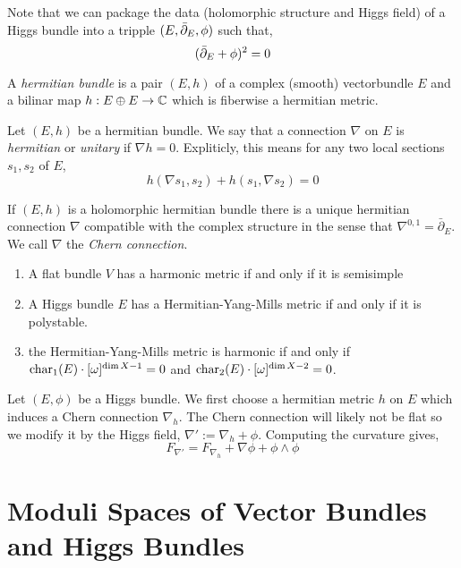 \documentclass[12pt]{article}
\begin{document}
Note that we can package the data (holomorphic structure and Higgs field) of a Higgs bundle into a tripple $(E, \bar{\partial}_E, \phi)$ such that,
\[ (\bar{\partial}_E + \phi)^2 = 0 \]

\begin{defn}
A \textit{hermitian bundle} is a pair $(E, h)$ of a complex (smooth) vectorbundle $E$ and a bilinar map $h : E \oplus E \to \mathbb{C}$ which is fiberwise a hermitian metric.
\end{defn}

\begin{defn}
Let $(E, h)$ be a hermitian bundle. We say that a connection $\nabla$ on $E$ is \textit{hermitian} or \textit{unitary} if $\nabla h = 0$. Expliticly, this means for any two local sections $s_1, s_2$ of $E$,
\[ h(\nabla s_1, s_2) + h(s_1, \nabla s_2) = 0 \] 
\end{defn}

\begin{theorem}
If $(E, h)$ is a holomorphic hermitian bundle there is a unique hermitian connection $\nabla$ compatible with the complex structure in the sense that $\nabla^{0,1} = \bar{\partial}_E$. We call $\nabla$ the \textit{Chern connection}.
\end{theorem}



\begin{theorem}
\begin{enumerate}
\item A flat bundle $V$ has a harmonic metric if and only if it is semisimple
\item A Higgs bundle $E$ has a Hermitian-Yang-Mills metric if and only if it is polystable. 
\item the Hermitian-Yang-Mills metric is harmonic if and only if $\operatorname{\mathrm{char}}_1(E) \cdot [\omega]^{\dim{X}-1} = 0$ and $\operatorname{\mathrm{char}}_2(E) \cdot [\omega]^{\dim{X}-2} = 0$.
\end{enumerate}
\end{theorem}

Let $(E, \phi)$ be a Higgs bundle. We first choose a hermitian metric $h$ on $E$ which induces a Chern connection $\nabla_h$. The Chern connection will likely not be flat so we modify it by the Higgs field, $\nabla' := \nabla_h + \phi$. Computing the curvature gives,
\[ F_{\nabla'} = F_{\nabla_h} + \nabla \phi + \phi \wedge \phi \]

\section{Moduli Spaces of Vector Bundles and Higgs Bundles}
\end{document}
